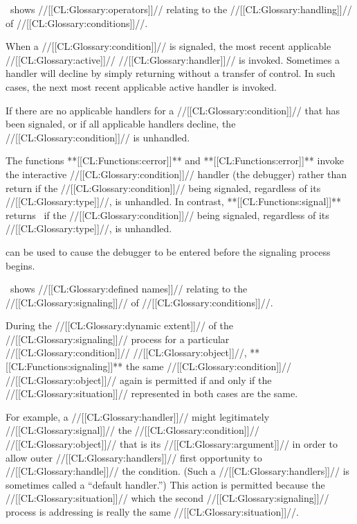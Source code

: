 \Thenextfigure\ shows //[[CL:Glossary:operators]]// relating to 
the //[[CL:Glossary:handling]]// of //[[CL:Glossary:conditions]]//.

 
 
When a //[[CL:Glossary:condition]]// is signaled, the most recent
applicable //[[CL:Glossary:active]]// //[[CL:Glossary:handler]]// is invoked.  
Sometimes a handler will decline by simply returning
without a transfer of control.
In such cases, the next most recent applicable active handler is
invoked. 
 
If there are no applicable handlers for a //[[CL:Glossary:condition]]// that
has been signaled, or if all applicable handlers decline, the
//[[CL:Glossary:condition]]// is unhandled.
 
The functions **[[CL:Functions:cerror]]** and **[[CL:Functions:error]]** invoke the
interactive //[[CL:Glossary:condition]]// handler (the debugger) rather than
return if the //[[CL:Glossary:condition]]// being signaled, regardless of
its //[[CL:Glossary:type]]//, is unhandled.  In contrast, **[[CL:Functions:signal]]**
returns \nil\ if the //[[CL:Glossary:condition]]// being signaled,
regardless of its //[[CL:Glossary:type]]//, is unhandled.

 can be used to cause the
debugger to be entered before the signaling process begins.
 
\Thenextfigure\ shows //[[CL:Glossary:defined names]]// relating to
the //[[CL:Glossary:signaling]]// of //[[CL:Glossary:conditions]]//.



During the //[[CL:Glossary:dynamic extent]]// of the //[[CL:Glossary:signaling]]// process for
a particular //[[CL:Glossary:condition]]// //[[CL:Glossary:object]]//, 
**[[CL:Functions:signaling]]** the same //[[CL:Glossary:condition]]// //[[CL:Glossary:object]]// again
is permitted if and only if the //[[CL:Glossary:situation]]// represented in both
cases are the same.

For example, a //[[CL:Glossary:handler]]// might legitimately //[[CL:Glossary:signal]]// 
the //[[CL:Glossary:condition]]// //[[CL:Glossary:object]]// that is its //[[CL:Glossary:argument]]//
in order to allow outer //[[CL:Glossary:handlers]]// first opportunity to //[[CL:Glossary:handle]]// 
the condition.  (Such a //[[CL:Glossary:handlers]]// is sometimes called a ``default handler.'')
This action is permitted because the //[[CL:Glossary:situation]]// which the second
//[[CL:Glossary:signaling]]// process is addressing is really the same //[[CL:Glossary:situation]]//.


